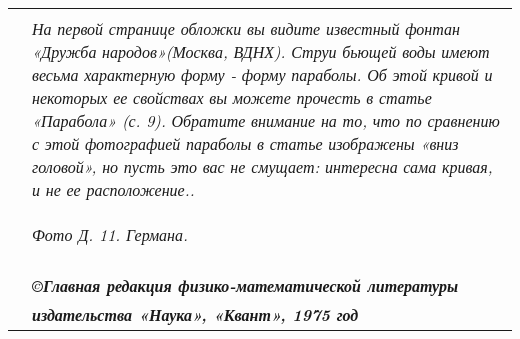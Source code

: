 \begin{minipage}{0.695\linewidth}
\begin{tabular}{r p{11cm}}
		\cline{2-2}
		&\\
		&\textit{\fontsize{7}{2}\selectfont На первой странице обложки вы видите известный фонтан «Дружба народов»(Москва, ВДНХ). Струи бьющей воды имеют весьма характерную форму - форму параболы. Об этой кривой и некоторых ее свойствах вы можете прочесть в статье «Парабола» (с. 9). Обратите внимание на то, что по сравнению с этой фотографией параболы в статье изображены «вниз головой», но пусть это вас не смущает: интересна сама кривая, и не ее расположение..}\vspace{-0.7cm}\\
		&\begin{flushright}
			\textit{\fontsize{6}{5}\selectfont Фото Д. 11. Германа.}
		\end{flushright}\vspace{-0.7cm}\\
		\cline{2-2}\vspace{-0.4cm}
		&\\
		& \textbf{\textit{\fontsize{7}{2}\selectfont \copyright Главная редакция физико-математической литературы}}\\
		&\vspace{-0.4cm}\hspace{0.36cm}\textbf{\textit{\fontsize{7}{2}\selectfont издательства «Наука», «Квант», 1975 год}}\\
	\end{tabular}
	\hfill
	\vline
	\hfill
\end{minipage}
